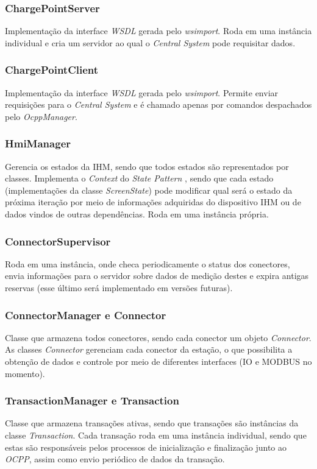         \subsubsection{ChargePointServer}
          Implementação da interface \textit{\ac{WSDL}} gerada pelo \textit{wsimport}. Roda em uma instância individual e cria um servidor ao qual o \textit{Central System} pode requisitar dados.
        \subsubsection{ChargePointClient}
          Implementação da interface \textit{\ac{WSDL}} gerada pelo \textit{wsimport}. Permite enviar requisições para o \textit{Central System} e é chamado apenas por comandos despachados pelo \textit{OcppManager}.
        \subsubsection{HmiManager}
          Gerencia os estados da \ac{IHM}, sendo que todos estados são representados por classes. Implementa o \textit{Context} do \textit{State Pattern} \cite{book-gof}, sendo que cada estado (implementações da classe \textit{ScreenState}) pode modificar qual será o estado da próxima iteração por meio de informações adquiridas do dispositivo \ac{IHM} ou de dados vindos de outras dependências. Roda em uma instância própria.
        \subsubsection{ConnectorSupervisor}
          Roda em uma instância, onde checa periodicamente o status dos conectores, envia informações para o servidor sobre dados de medição destes e expira antigas reservas (esse último será implementado em versões futuras).
        \subsubsection{ConnectorManager e Connector}
          Classe que armazena todos conectores, sendo cada conector um objeto \textit{Connector}. As classes \textit{Connector} gerenciam cada conector da estação, o que possibilita a obtenção de dados e controle por meio de diferentes interfaces (\ac{IO} e MODBUS no momento).
        \subsubsection{TransactionManager e Transaction}
          Classe que armazena transações ativas, sendo que transações são instâncias da classe \textit{Transaction}. Cada transação roda em uma instância individual, sendo que estas são responsáveis pelos processos de inicialização e finalização junto ao \textit{\ac{OCPP}}, assim como envio periódico de dados da transação.

